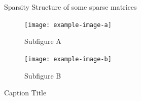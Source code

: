 \documentclass[twocolumn,compsoc,journal,demo]{IEEEtran}
\begin{document}
\begin{figure}
\begin{minipage}[b]{\columnwidth}
			\hfill 
		\end{minipage}
		\caption{Sparsity Structure of some sparse matrices}
		\label{freq} 
	\end{figure} 
	
	\begin{figure}
		\centering %
		\begin{subfigure}{0.45\linewidth}
			\texttt{[image: example-image-a]}
			\caption{Subfigure A}
			\label{subfig:a}
		\end{subfigure}
		\hfill
		\begin{subfigure}{0.45\linewidth}
			\texttt{[image: example-image-b]}
			\caption{Subfigure B}
			\label{subfig:b}
		\end{subfigure}
		\caption{Caption Title}
		\label{fig:subfigures}
	\end{figure}
\end{document}
